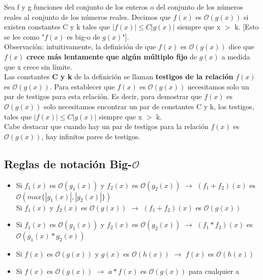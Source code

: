 \documentclass{article}
\begin{document}
Sea f y g funciones del conjunto de los enteros o del conjunto de los números reales al conjunto de los números reales. Decimos que $f(x)$ es $\mathcal{O}(g(x))$ si existen constantes C y k tales que $|f(x)| \leq C|g(x)|$ siempre que x $>$ k. [Esto se lee como "$f(x)$ es big-o de $g(x)$"]. \\

Observación: intuitivamente, la definición de que $f(x)$ es $\mathcal{O}(g(x))$ dice que $f(x)$ \textbf{crece más lentamente que algún múltiplo fijo} de $g(x)$ a medida que x crece sin límite. \\

Las constantes \textbf{C y k} de la definición se llaman \textbf{testigos de la relación} $f(x)$ es $\mathcal{O}(g(x))$. Para establecer que $f(x)$ es $\mathcal{O}(g(x))$ necesitamos solo un par de testigos para esta relación. Es decir, para demostrar que $f(x)$ es $\mathcal{O}(g(x))$ solo necesitamos encontrar un par de constantes C y k, los testigos, tales que $|f(x)| \leq C|g(x)|$ siempre que x $>$ k. \\

Cabe destacar que cuando hay un par de testigos para la relación $f(x)$ es $\mathcal{O}(g(x))$, hay infinitos pares de testigos. \\

\subsection{Reglas de notación Big-$\mathcal{O}$}
\begin{itemize}
    \item Si $f_1(x)$ es $\mathcal{O}(g_1(x))$ y $f_2(x)$ es $\mathcal{O}(g_2(x))$ $\xrightarrow{}$ $(f_1+f_2)(x)$ es $\mathcal{O}(max\{|g_1(x)|, |g_2(x)|\})$ \\
    Si $f_1(x)$ y $f_2(x)$ es $\mathcal{O}(g(x))$ $\xrightarrow{}$ $(f_1+f_2)(x)$ es $\mathcal{O}(g(x))$
    
    \item Si $f_1(x)$ es $\mathcal{O}(g_1(x))$ y $f_2(x)$ es $\mathcal{O}(g_2(x))$ $\xrightarrow{}$ $(f_1*f_2)(x)$ es $\mathcal{O}(g_1(x)*g_2(x))$

    \item Si $f(x)$ es $\mathcal{O}(g(x))$ y $g(x)$ es $\mathcal{O}(h(x))$ $\xrightarrow{}$ $f(x)$ es $\mathcal{O}(h(x))$

    \item Si $f(x)$ es $\mathcal{O}(g(x))$ $\xrightarrow{}$ $a*f(x)$ es $\mathcal{O}(g(x))$ para cualquier a
\end{itemize}
\end{document}
